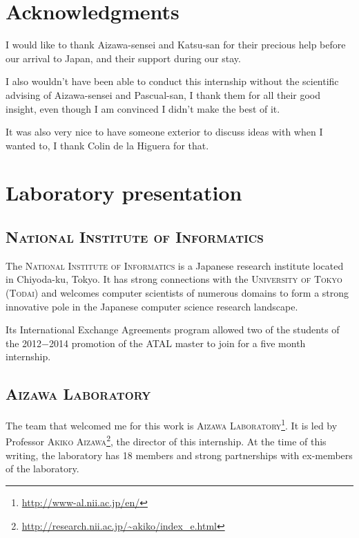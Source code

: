 \documentclass[a4paper, 11pt, onepage]{scrreprt}
\begin{document}
\tableofcontents

\chapter{Acknowledgments}

I would like to thank Aizawa-sensei and Katsu-san for their precious
help before our arrival to Japan, and their support during our stay.

I also wouldn't have been able to conduct this internship without the
scientific advising of Aizawa-sensei and Pascual-san, I thank them for
all their good insight, even though I am convinced I didn't make the
best of it.

It was also very nice to have someone exterior to discuss ideas with
when I wanted to, I thank Colin de la Higuera for that.

\chapter{Laboratory presentation}

\section{\textsc{National Institute of Informatics}}
\label{sec:national-institute-of-informatics}

The \textsc{National Institute of Informatics} is a Japanese research
institute located in Chiyoda-ku, Tokyo. It has strong connections with
the \textsc{University of Tokyo} (\textsc{Todai}) and welcomes
computer scientists of numerous domains to form a strong innovative
pole in the Japanese computer science research landscape.

Its International Exchange Agreements program allowed two of the
students of the 2012−2014 promotion of the ATAL master to join for a
five month internship.

\section{\textsc{Aizawa Laboratory}}
\label{sec:aizawa-laboratory}

The team that welcomed me for this work is \textsc{Aizawa
  Laboratory}\footnote{\url{http://www-al.nii.ac.jp/en/}}. It is led
by Professor \textsc{Akiko
  Aizawa}\footnote{\url{http://research.nii.ac.jp/~akiko/index_e.html}},
the director of this internship. At the time of this writing, the
laboratory has 18 members and strong partnerships with ex-members of
the laboratory.
\end{document}
